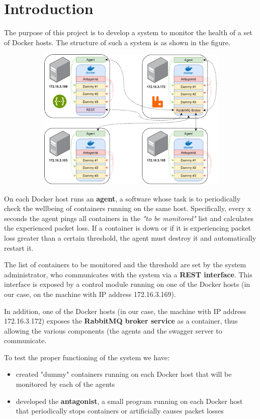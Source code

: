 \section{Introduction}
The purpose of this project is to develop a system to monitor the health of a set of Docker hosts. The structure of such a system is as shown in the figure. 

\begin{figure}[H]
	\begin{subfigure}{\textwidth}
	\centering
		\includegraphics[width=0.9\linewidth]{img/structure.png} 
	\end{subfigure}
\end{figure}

\noindent On each Docker host runs an \textbf{agent}, a software whose task is to periodically check the wellbeing of containers running on the same host. Specifically, every x seconds the agent pings all containers in the \textit{"to be monitored"} list and calculates the experienced packet loss. If a container is down or if it is experiencing packet loss greater than a certain threshold, the agent must destroy it and automatically restart it. 

\noindent The list of containers to be monitored and the threshold are set by the system administrator, who communicates with the system via a \textbf{REST interface}. This interface is exposed by a control module running on one of the Docker hosts (in our case, on the machine with IP address 172.16.3.169).

\noindent In addition, one of the Docker hosts (in our case, the machine with IP address 172.16.3.172) exposes the \textbf{RabbitMQ broker service} as a container, thus allowing the various components (the agents and the swagger server to communicate.

\noindent To test the proper functioning of the system we have:
\begin{itemize}
	\item created "dummy" containers running on each Docker host that will be monitored by each of the agents 
	\item developed the \textbf{antagonist}, a small program running on each Docker host that periodically stops containers or artificially causes packet losses 
\end{itemize}